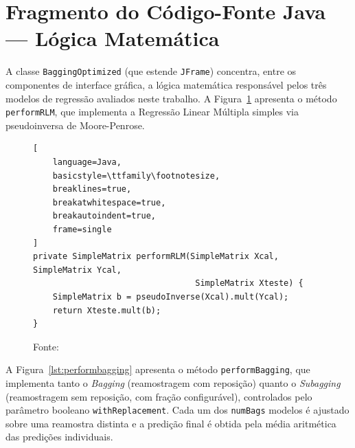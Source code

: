 \section{Fragmento do Código-Fonte Java --- Lógica Matemática}
\label{sec:codigo_java_nucleo}

A classe \texttt{BaggingOptimized} (que estende \texttt{JFrame}) concentra, entre os componentes de interface gráfica, a lógica matemática responsável pelos três modelos de regressão avaliados neste trabalho. A Figura~\ref{lst:performrlm} apresenta o método \texttt{performRLM}, que implementa a Regressão Linear Múltipla simples via pseudoinversa de Moore-Penrose.


\begin{figure}[H]
\centering
\caption{Regressão Linear Múltipla via pseudoinversa (\texttt{BaggingOptimized.java}).}
\label{lst:performrlm}
\begin{lstlisting}[
    language=Java, 
    basicstyle=\ttfamily\footnotesize,
    breaklines=true,
    breakatwhitespace=true,
    breakautoindent=true,
    frame=single
]
private SimpleMatrix performRLM(SimpleMatrix Xcal, SimpleMatrix Ycal,
                                 SimpleMatrix Xteste) {
    SimpleMatrix b = pseudoInverse(Xcal).mult(Ycal);
    return Xteste.mult(b);
}
\end{lstlisting}
\caption*{Fonte: \oautor}
\end{figure}


A Figura~\ref{lst:performbagging} apresenta o método \texttt{performBagging},
que implementa tanto o \textit{Bagging} (reamostragem com reposição) quanto o
\textit{Subagging} (reamostragem sem reposição, com fração configurável),
controlados pelo parâmetro booleano \texttt{withReplacement}. Cada um dos
\texttt{numBags} modelos é ajustado sobre uma reamostra distinta e a predição
final é obtida pela média aritmética das predições individuais.

